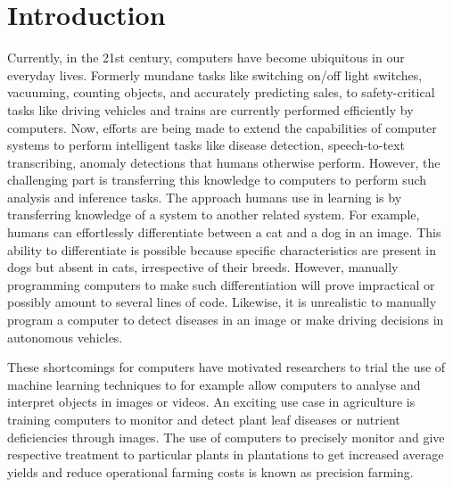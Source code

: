 
\chapter{Introduction} %

\label{Chapter1} %


\newcommand{\keyword}[1]{\textbf{#1}}
\newcommand{\tabhead}[1]{\textbf{#1}}
\newcommand{\code}[1]{\texttt{#1}}
\newcommand{\file}[1]{\texttt{\bfseries#1}}
\newcommand{\option}[1]{\texttt{\itshape#1}}


Currently, in the 21st century, computers have become ubiquitous in our everyday lives. Formerly mundane tasks like switching on/off light switches, vacuuming, counting objects, and accurately predicting sales, to safety-critical tasks like driving vehicles and trains are currently performed efficiently by computers. Now, efforts are being made to extend the capabilities of computer systems to perform intelligent tasks like disease detection, speech-to-text transcribing, anomaly detections that humans otherwise perform. However, the challenging part is transferring this knowledge to computers to perform such analysis and inference tasks. The approach humans use in learning is by transferring knowledge of a system to another related system. For example, humans can effortlessly differentiate between a cat and a dog in an image. This ability to differentiate is possible because specific characteristics are present in dogs but absent in cats, irrespective of their breeds. However, manually programming computers to make such differentiation will prove impractical or possibly amount to several lines of code. Likewise, it is unrealistic to manually program a computer to detect diseases in an image or make driving decisions in autonomous vehicles. 

These shortcomings for computers have motivated researchers to trial the use of machine learning techniques to for example allow computers to analyse and interpret objects in images or videos. An exciting use case in agriculture is training computers to monitor and detect plant leaf diseases or nutrient deficiencies through images. The use of computers to precisely monitor and give respective treatment to particular plants in plantations to get increased average yields and reduce operational farming costs is known as precision farming. 

